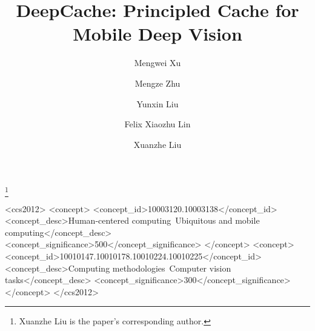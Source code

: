 \documentclass[10pt,acmtog]{acmart}
\newcommand{\framework}{DeepCache\xspace}
\begin{document}
\title{\framework: Principled Cache for Mobile Deep Vision}


 \author{Mengwei Xu}

  \author{Mengze Zhu}



 \author{Yunxin Liu}

 \author{Felix Xiaozhu Lin}
   
    \author{Xuanzhe Liu}\thanks{Xuanzhe Liu is the paper's corresponding author.}


\begin{CCSXML}
<ccs2012>
<concept>
<concept_id>10003120.10003138</concept_id>
<concept_desc>Human-centered computing~Ubiquitous and mobile computing</concept_desc>
<concept_significance>500</concept_significance>
</concept>
<concept>
<concept_id>10010147.10010178.10010224.10010225</concept_id>
<concept_desc>Computing methodologies~Computer vision tasks</concept_desc>
<concept_significance>300</concept_significance>
</concept>
</ccs2012>
\end{CCSXML}

\end{document}
